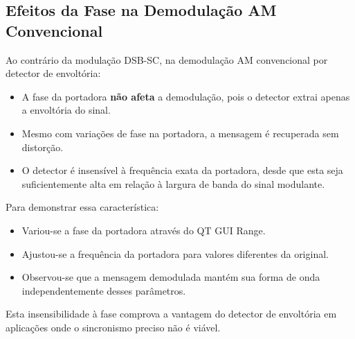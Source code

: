 \subsection{Efeitos da Fase na Demodulação AM Convencional}

Ao contrário da modulação DSB-SC, na demodulação AM convencional por detector de envoltória:
\begin{itemize}
    \item A fase da portadora \textbf{não afeta} a demodulação, pois o detector extrai apenas a envoltória do sinal.
    \item Mesmo com variações de fase na portadora, a mensagem é recuperada sem distorção.
    \item O detector é insensível à frequência exata da portadora, desde que esta seja suficientemente alta em relação à largura de banda do sinal modulante.
\end{itemize}

Para demonstrar essa característica:
\begin{itemize}
    \item Variou-se a fase da portadora através do QT GUI Range.
    \item Ajustou-se a frequência da portadora para valores diferentes da original.
    \item Observou-se que a mensagem demodulada mantém sua forma de onda independentemente desses parâmetros.
\end{itemize}

Esta insensibilidade à fase comprova a vantagem do detector de envoltória em aplicações onde o sincronismo preciso não é viável.